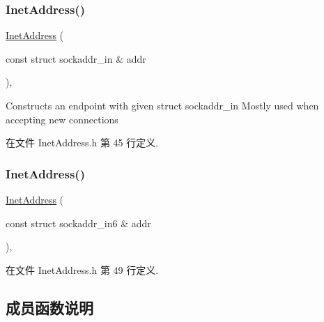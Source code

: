 \subsubsection{\texorpdfstring{Inet\+Address()}{InetAddress()}\hspace{0.1cm}{\footnotesize\ttfamily [3/4]}}
{\footnotesize\ttfamily \hyperlink{classmuduo_1_1net_1_1InetAddress}{Inet\+Address} (\begin{DoxyParamCaption}\item[{const struct sockaddr\+\_\+in \&}]{addr }\end{DoxyParamCaption})\hspace{0.3cm}{\ttfamily [inline]}, {\ttfamily [explicit]}}

Constructs an endpoint with given struct {\ttfamily sockaddr\+\_\+in} Mostly used when accepting new connections 

在文件 Inet\+Address.\+h 第 45 行定义.

\mbox{\label{classmuduo_1_1net_1_1InetAddress_a718c0a2238c40742e85f42befd0a8f48}} 
\subsubsection{\texorpdfstring{Inet\+Address()}{InetAddress()}\hspace{0.1cm}{\footnotesize\ttfamily [4/4]}}
{\footnotesize\ttfamily \hyperlink{classmuduo_1_1net_1_1InetAddress}{Inet\+Address} (\begin{DoxyParamCaption}\item[{const struct sockaddr\+\_\+in6 \&}]{addr }\end{DoxyParamCaption})\hspace{0.3cm}{\ttfamily [inline]}, {\ttfamily [explicit]}}



在文件 Inet\+Address.\+h 第 49 行定义.



\subsection{成员函数说明}
\mbox{\label{classmuduo_1_1net_1_1InetAddress_ab891669cb0d4a26cacfe05d880faa522}} 
